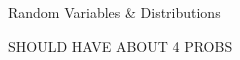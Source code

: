 \documentclass[handout]{mcs}
\begin{document}


\begin{staffnotes}
Random Variables \& Distributions

SHOULD HAVE ABOUT 4 PROBS
\end{staffnotes}



\end{document}
